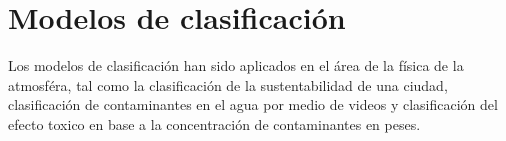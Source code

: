 \section{Modelos de clasificación}

Los modelos de clasificación han sido aplicados en el área de la física de la atmosféra, tal como la clasificación de la sustentabilidad de una ciudad\cite{Haldorai_2020}, clasificación de contaminantes en el agua por medio de videos\cite{KangSeung_2021} y clasificación del efecto toxico en base a la concentración de contaminantes en peses\cite{Verhaar_2000}.



